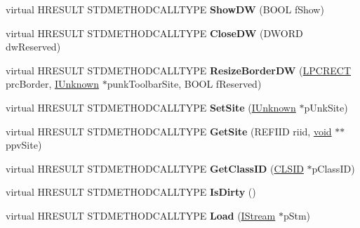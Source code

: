 \begin{DoxyCompactItemize}
virtual H\+R\+E\+S\+U\+LT S\+T\+D\+M\+E\+T\+H\+O\+D\+C\+A\+L\+L\+T\+Y\+PE {\bfseries Show\+DW} (B\+O\+OL f\+Show)
\item 
\mbox{\label{class_c_base_bar_af19b4b1edb0e7b9cc5345cc5def8862b}} 
virtual H\+R\+E\+S\+U\+LT S\+T\+D\+M\+E\+T\+H\+O\+D\+C\+A\+L\+L\+T\+Y\+PE {\bfseries Close\+DW} (D\+W\+O\+RD dw\+Reserved)
\item 
\mbox{\label{class_c_base_bar_ae4c86317b670e258f7222faddbbd4d73}} 
virtual H\+R\+E\+S\+U\+LT S\+T\+D\+M\+E\+T\+H\+O\+D\+C\+A\+L\+L\+T\+Y\+PE {\bfseries Resize\+Border\+DW} (\hyperlink{structtag_r_e_c_t}{L\+P\+C\+R\+E\+CT} prc\+Border, \hyperlink{interface_i_unknown}{I\+Unknown} $\ast$punk\+Toolbar\+Site, B\+O\+OL f\+Reserved)
\item 
\mbox{\label{class_c_base_bar_ae37d4dd8b6fa6cb70c385374d98d065f}} 
virtual H\+R\+E\+S\+U\+LT S\+T\+D\+M\+E\+T\+H\+O\+D\+C\+A\+L\+L\+T\+Y\+PE {\bfseries Set\+Site} (\hyperlink{interface_i_unknown}{I\+Unknown} $\ast$p\+Unk\+Site)
\item 
\mbox{\label{class_c_base_bar_a76be528cbb28c8b407a7bf7c284db02e}} 
virtual H\+R\+E\+S\+U\+LT S\+T\+D\+M\+E\+T\+H\+O\+D\+C\+A\+L\+L\+T\+Y\+PE {\bfseries Get\+Site} (R\+E\+F\+I\+ID riid, \hyperlink{interfacevoid}{void} $\ast$$\ast$ppv\+Site)
\item 
\mbox{\label{class_c_base_bar_adea624ddd7bd8fdf2ef3985b3848619e}} 
virtual H\+R\+E\+S\+U\+LT S\+T\+D\+M\+E\+T\+H\+O\+D\+C\+A\+L\+L\+T\+Y\+PE {\bfseries Get\+Class\+ID} (\hyperlink{struct___i_i_d}{C\+L\+S\+ID} $\ast$p\+Class\+ID)
\item 
\mbox{\label{class_c_base_bar_a1370fb3926e565c490d72a7b14063293}} 
virtual H\+R\+E\+S\+U\+LT S\+T\+D\+M\+E\+T\+H\+O\+D\+C\+A\+L\+L\+T\+Y\+PE {\bfseries Is\+Dirty} ()
\item 
\mbox{\label{class_c_base_bar_a2b5b251f1d43f289c8b653d3cb1950fa}} 
virtual H\+R\+E\+S\+U\+LT S\+T\+D\+M\+E\+T\+H\+O\+D\+C\+A\+L\+L\+T\+Y\+PE {\bfseries Load} (\hyperlink{interface_i_stream}{I\+Stream} $\ast$p\+Stm)
\item 
\mbox{\label{class_c_base_bar_a4972aa23f16fc57e773dcd9a28173ac3}} 
$$
\end{DoxyCompactItemize}
